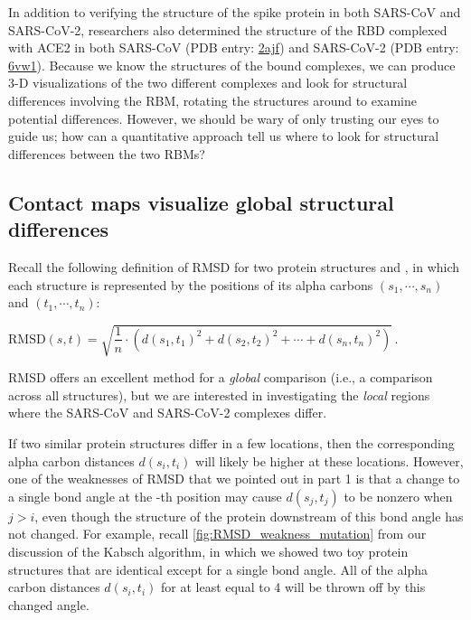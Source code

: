 In addition to verifying the structure of the spike protein in both SARS-CoV and SARS-CoV-2, researchers also determined the structure of the RBD complexed with ACE2 in both SARS-CoV (PDB entry: \href{https://www.rcsb.org/structure/2ajf}{2ajf}) and SARS-CoV-2 (PDB entry: \href{https://www.rcsb.org/structure/6vw1}{6vw1}). Because we know the structures of the bound complexes, we can produce 3-D visualizations of the two different complexes and look for structural differences involving the RBM, rotating the structures around to examine potential differences. However, we should be wary of only trusting our eyes to guide us; how can a quantitative approach tell us where to look for structural differences between the two RBMs?\\

\begin{note}\end{note}

\FloatBarrier
{}
\subsection{Contact maps visualize global structural differences}

Recall the following definition of RMSD for two protein structures  and , in which each structure is represented by the positions of its  alpha carbons $(s_{1}, \cdots, s_{n})$ and $(t_{1}, \cdots, t_{n})$:

\begin{center}
$\text{RMSD}(s, t) = \sqrt{\dfrac{1}{n} \cdot (d(s_1, t_1)^2 + d(s_2, t_2)^2 + \cdots + d(s_n, t_n)^2)}$\,.
\end{center}

\noindent RMSD offers an excellent method for a \textit{global} comparison (i.e., a comparison across all structures), but we are interested in investigating the \textit{local} regions where the SARS-CoV and SARS-CoV-2 complexes differ.

If two similar protein structures differ in a few locations, then the corresponding alpha carbon distances $d(s_{i}, t_{i})$ will likely be higher at these locations. However, one of the weaknesses of RMSD that we pointed out in part 1 is that a change to a single bond angle at the -th position may cause $d(s_{j}, t_{j})$ to be nonzero when $j > i$, even though the structure of the protein downstream of this bond angle has not changed. For example, recall \autoref{fig:RMSD_weakness_mutation} from our discussion of the Kabsch algorithm, in which we showed two toy protein structures that are identical except for a single bond angle. All of the alpha carbon distances $d(s_{i}, t_{i})$ for  at least equal to 4 will be thrown off by this changed angle.

